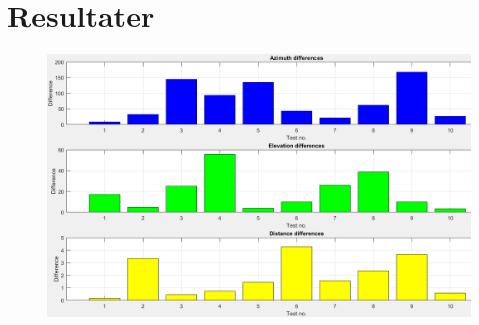 \section{Resultater}



\begin{figure}
	\centering
	\includegraphics[width=1\linewidth]{All_Pics/resoverblikdiff.png}
	\caption{}
	\label{fig:resoverblikdiff}
\end{figure}
